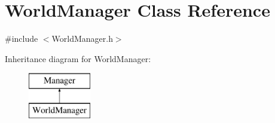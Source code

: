 \hypertarget{class_world_manager}{\section{World\+Manager Class Reference}
\label{class_world_manager}
}


{\ttfamily \#include $<$World\+Manager.\+h$>$}

Inheritance diagram for World\+Manager\+:\begin{figure}[H]
\begin{center}
\leavevmode
\includegraphics[height=2.000000cm]{class_world_manager}
\end{center}
\end{figure}
